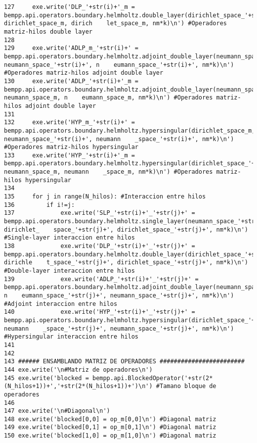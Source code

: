 \documentclass[12pt,letterpaper]{report}
\numberwithin{equation}{section}
\begin{document}
\begin{lstlisting}
127     exe.write('DLP_'+str(i)+'_m = bempp.api.operators.boundary.helmholtz.double_layer(dirichlet_space_'+str(i)+', dirichlet_space_m, dirich    let_space_m, nm*k)\n') #Operadores matriz-hilos double layer
128 
129     exe.write('ADLP_m_'+str(i)+' = bempp.api.operators.boundary.helmholtz.adjoint_double_layer(neumann_space_m, neumann_space_'+str(i)+', n    eumann_space_'+str(i)+', nm*k)\n') #Operadores matriz-hilos adjoint double layer
130     exe.write('ADLP_'+str(i)+'_m = bempp.api.operators.boundary.helmholtz.adjoint_double_layer(neumann_space_'+str(i)+', neumann_space_m, n    eumann_space_m, nm*k)\n') #Operadores matriz-hilos adjoint double layer
131 
132     exe.write('HYP_m_'+str(i)+' = bempp.api.operators.boundary.helmholtz.hypersingular(dirichlet_space_m, neumann_space_'+str(i)+', neumann    _space_'+str(i)+', nm*k)\n') #Operadores matriz-hilos hypersingular
133     exe.write('HYP_'+str(i)+'_m = bempp.api.operators.boundary.helmholtz.hypersingular(dirichlet_space_'+str(i)+', neumann_space_m, neumann    _space_m, nm*k)\n') #Operadores matriz-hilos hypersingular
134 
135     for j in range(N_hilos): #Interaccion entre hilos
136         if i!=j:
137             exe.write('SLP_'+str(i)+'_'+str(j)+' = bempp.api.operators.boundary.helmholtz.single_layer(neumann_space_'+str(i)+', dirichlet_    space_'+str(j)+', dirichlet_space_'+str(j)+', nm*k)\n') #Single-layer interaccion entre hilos
138             exe.write('DLP_'+str(i)+'_'+str(j)+' = bempp.api.operators.boundary.helmholtz.double_layer(dirichlet_space_'+str(i)+', dirichle    t_space_'+str(j)+', dirichlet_space_'+str(j)+', nm*k)\n') #Double-layer interaccion entre hilos
139             exe.write('ADLP_'+str(i)+'_'+str(j)+' = bempp.api.operators.boundary.helmholtz.adjoint_double_layer(neumann_space_'+str(i)+', n    eumann_space_'+str(j)+', neumann_space_'+str(j)+', nm*k)\n') #Adjoint interaccion entre hilos
140             exe.write('HYP_'+str(i)+'_'+str(j)+' = bempp.api.operators.boundary.helmholtz.hypersingular(dirichlet_space_'+str(i)+', neumann    _space_'+str(j)+', neumann_space_'+str(j)+', nm*k)\n') #Hypersingular interaccion entre hilos
141 
142 
143 ###### ENSAMBLANDO MATRIZ DE OPERADORES ########################
144 exe.write('\n#Matriz de operadores\n')
145 exe.write('blocked = bempp.api.BlockedOperator('+str(2*(N_hilos+1))+','+str(2*(N_hilos+1))+')\n') #Tamano bloque de operadores
146 
147 exe.write('\n#Diagonal\n')
148 exe.write('blocked[0,0] = op_m[0,0]\n') #Diagonal matriz
149 exe.write('blocked[0,1] = op_m[0,1]\n') #Diagonal matriz
150 exe.write('blocked[1,0] = op_m[1,0]\n') #Diagonal matriz

\end{lstlisting}
\end{document}
